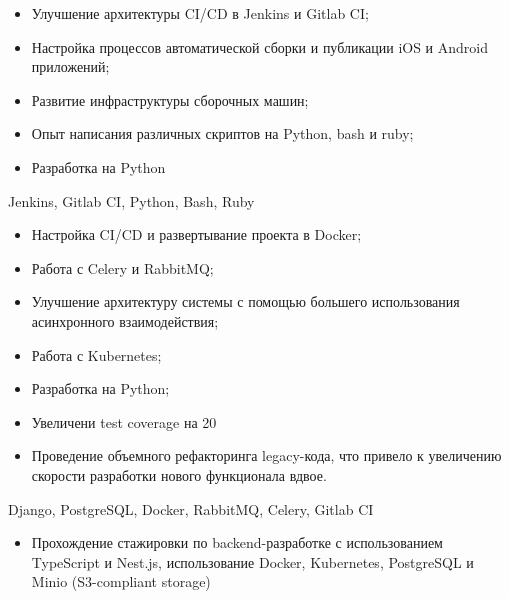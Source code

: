 \documentclass[10pt,a4paper,ragged2e,withhyper]{altacv}
\begin{document}
\begin{paracol}{2}


\begin{itemize}
\item Улучшение архитектуры CI/CD в Jenkins и Gitlab CI;
\item Настройка процессов автоматической сборки и публикации iOS и Android приложений;
\item Развитие инфраструктуры сборочных машин;
\item Опыт написания различных скриптов на Python, bash и ruby;
\item Разработка на Python
\end{itemize}
Jenkins, Gitlab CI, Python, Bash, Ruby

\divider


\begin{itemize}
\item Настройка CI/CD и развертывание проекта в Docker;
\item Работа с Celery и RabbitMQ;
\item Улучшение архитектуру системы с помощью большего использования асинхронного взаимодействия;
\item Работа с Kubernetes;
\item Разработка на Python;
\item Увеличени test coverage на 20%
\item Проведение объемного рефакторинга legacy-кода, что привело к увеличению скорости разработки нового функционала вдвое.
\end{itemize}
Django, PostgreSQL, Docker, RabbitMQ, Celery, Gitlab CI

\divider


\begin{itemize}
    \item Прохождение стажировки по backend-разработке с использованием TypeScript и Nest.js, использование Docker, Kubernetes, PostgreSQL и Minio (S3-compliant storage)
\end{itemize}


\end{paracol}
\end{document}
